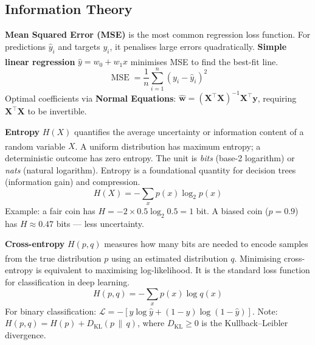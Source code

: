     \subsection{Information Theory}
    \begin{tcbitemize}[ skin=sectionraster ]

        \tcbitem[title={MSE and Linear Regression}, raster multicolumn=6]
        \textbf{Mean Squared Error (MSE)} is the most common regression loss function. For predictions $\hat{y}_i$ and targets $y_i$, it penalises large errors quadratically. \textbf{Simple linear regression} $\hat{y} = w_0 + w_1 x$ minimises MSE to find the best-fit line\textsuperscript{\cite{jamesIntroductionStatisticalLearning2013}}.
        \tcblower
        \begin{equation}
            \operatorname{MSE} = \frac{1}{n}\sum_{i=1}^n (y_i - \hat{y}_i)^2
        \end{equation}
        Optimal coefficients via \textbf{Normal Equations}: $\hat{\mathbf{w}} = (\mathbf{X}^\top\mathbf{X})^{-1}\mathbf{X}^\top\mathbf{y}$, requiring $\mathbf{X}^\top\mathbf{X}$ to be invertible.

        \tcbitem[title={Shannon Entropy}, raster multicolumn=6]
        \textbf{Entropy} $H(X)$ quantifies the average uncertainty or information content of a random variable $X$\textsuperscript{\cite{mackayInformationTheoryInference2005}}. A uniform distribution has maximum entropy; a deterministic outcome has zero entropy. The unit is \emph{bits} (base-2 logarithm) or \emph{nats} (natural logarithm). Entropy is a foundational quantity for decision trees (information gain) and compression.
        \tcblower
        \begin{equation}
            H(X) = -\sum_{x} p(x) \log_2 p(x)
        \end{equation}
        Example: a fair coin has $H = -2 \times 0.5 \log_2 0.5 = 1$ bit. A biased coin ($p=0.9$) has $H \approx 0.47$ bits — less uncertainty.

        \tcbitem[title={Cross-Entropy Loss}, raster multicolumn=6]
        \textbf{Cross-entropy} $H(p, q)$ measures how many bits are needed to encode samples from the true distribution $p$ using an estimated distribution $q$\textsuperscript{\cite{mackayInformationTheoryInference2005}}. Minimising cross-entropy is equivalent to maximising log-likelihood. It is the standard loss function for classification in deep learning.
        \tcblower
        \begin{equation}
            H(p, q) = -\sum_{x} p(x) \log q(x)
        \end{equation}
        For binary classification: $\mathcal{L} = -\left[y \log \hat{y} + (1-y) \log(1 - \hat{y})\right]$. Note: $H(p,q) = H(p) + D_{\mathrm{KL}}(p\,\|\,q)$, where $D_{\mathrm{KL}} \geq 0$ is the Kullback–Leibler divergence.

    \end{tcbitemize}


